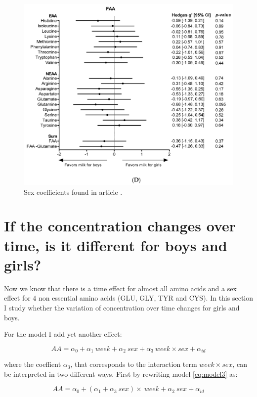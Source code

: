 \documentclass[12pt]{article}
\begin{document}
\begin{figure}[!htb]
  \includegraphics[width= \textwidth]{../sex/nutrientsFAA.png}
  \caption{Sex coefficients found in article \cite{NutrientsDutch}.}
  \label{fig:nutrientsFAA}
\end{figure}

\section{If the concentration changes over time, is it different for boys and girls?}

Now we know that there is a time effect for almost all amino acids and a sex effect for $4$ non essential amino acids (GLU, GLY, TYR and CYS). In this section I study whether the variation of concentration over time changes for girls and boys.

For the model I add yet another effect:

\begin{equation} \label{eq:model3}
  AA = \alpha_0 + \alpha_1 \ week + \alpha_2 \ sex + \alpha_3 \ week \times sex + \alpha_{id}
\end{equation}

where the coeffient $\alpha_3$, that corresponds to the interaction term $week \times sex$, can be interpreted in two different ways. First by rewriting model \ref{eq:model3} as:

\begin{equation} \label{eq:model3a}
  AA = \alpha_0 + \left(\alpha_1  + \alpha_3 \ sex \right) \times \ week + \alpha_2 \ sex  + \alpha_{id}
\end{equation}
\end{document}
